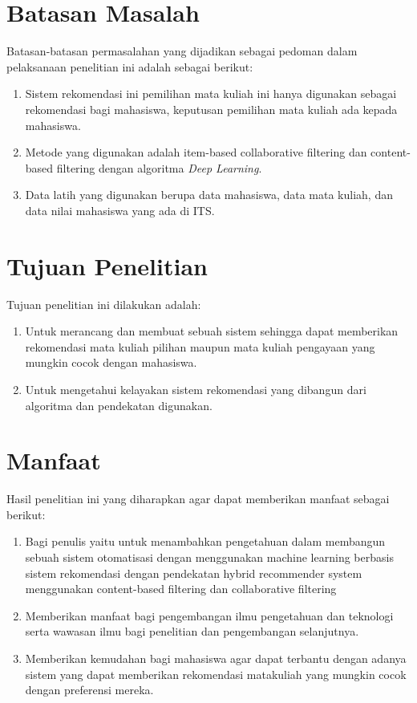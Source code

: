 \section{Batasan Masalah}
Batasan-batasan permasalahan yang dijadikan sebagai pedoman dalam pelaksanaan penelitian ini adalah sebagai berikut:
\begin{enumerate}[noitemsep]
      \item Sistem rekomendasi ini pemilihan mata kuliah
            ini hanya digunakan sebagai rekomendasi bagi
            mahasiswa, keputusan pemilihan mata kuliah
            ada kepada mahasiswa.
      \item Metode yang digunakan adalah item-based
            collaborative filtering dan content-based
            filtering dengan algoritma \emph{Deep Learning}.
      \item Data latih yang digunakan berupa data mahasiswa, data mata kuliah, dan data nilai mahasiswa yang ada di ITS.
\end{enumerate}

\section{Tujuan Penelitian}
Tujuan penelitian ini dilakukan adalah:
\begin{enumerate}[noitemsep]
      \item Untuk merancang dan membuat sebuah sistem sehingga dapat memberikan rekomendasi mata kuliah pilihan
            maupun mata kuliah pengayaan yang mungkin cocok dengan mahasiswa.
      \item Untuk mengetahui kelayakan sistem rekomendasi yang dibangun dari algoritma dan pendekatan
            digunakan.
\end{enumerate}

\section{Manfaat}
Hasil penelitian ini yang diharapkan agar dapat memberikan manfaat sebagai berikut:
\begin{enumerate}[noitemsep]
      \item Bagi penulis yaitu untuk menambahkan pengetahuan dalam membangun sebuah sistem
            otomatisasi dengan menggunakan machine learning berbasis sistem rekomendasi dengan pendekatan hybrid recommender system menggunakan content-based filtering dan collaborative filtering
      \item Memberikan manfaat bagi pengembangan ilmu pengetahuan dan teknologi serta wawasan ilmu bagi
            penelitian dan pengembangan selanjutnya.
      \item Memberikan kemudahan bagi mahasiswa agar dapat terbantu dengan adanya sistem yang dapat memberikan rekomendasi matakuliah yang mungkin cocok dengan preferensi mereka.
\end{enumerate}